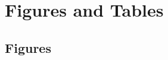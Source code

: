 \documentclass[11pt]{article}
\begin{document}
\clearpage
\pagebreak

\begin{singlespace}

%
{}
\end{singlespace}

\pagebreak
\clearpage

\section*{Figures and Tables}

\subsection{Figures}

%
%
%
%

%
\end{document}
